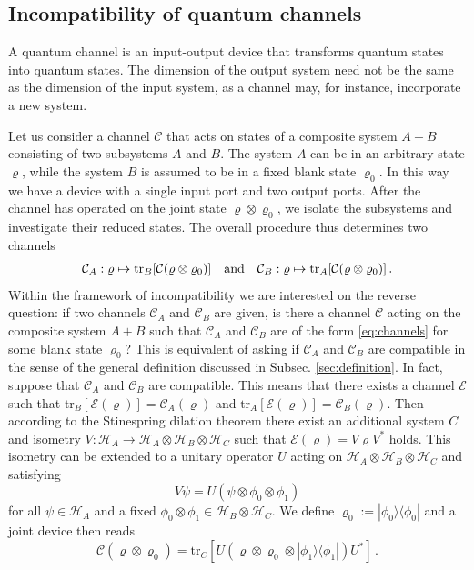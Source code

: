 \documentclass[12pt]{article}
\theoremstyle{definition}
\newcommand{\hi}{\mathcal{H}} %
\newcommand{\Cc}{\mathcal{C}} %
\newcommand{\Ec}{\mathcal{E}} %
\begin{document}
{%
\subsection{Incompatibility of quantum channels}

A quantum channel is an input-output device that transforms quantum states into quantum states. The dimension of the output system need not be the same as the dimension of the input system, as a channel may, for instance, incorporate a new system. 

Let us consider a channel $\Cc$ that acts on states of a composite system $A+B$ consisting of two subsystems $A$ and $B$. The system $A$ can be in an arbitrary state $\varrho$, while the system $B$ is assumed to be in a fixed blank state $\varrho_0$. 
In this way we have a device with a single input port and two output ports.
After the channel has operated on the joint state $\varrho \otimes \varrho_0$, we isolate the subsystems and investigate their reduced states.
The overall procedure thus determines two channels 
\begin{align}\label{eq:channels}
\Cc_A:\varrho \mapsto {\rm tr}_B[\Cc(\varrho \otimes \varrho_0)] \quad \textrm{and} \quad  \Cc_B:\varrho \mapsto {\rm tr}_A[\Cc(\varrho \otimes \varrho_0)] \, .
\end{align}
Within the framework of incompatibility we are interested on the reverse question: if two channels $\Cc_A$ and $\Cc_B$ are given, is there a channel $\Cc$ acting on the composite system $A+B$ such that $\Cc_A$ and $\Cc_B$ are of the form \eqref{eq:channels} for some blank state $\varrho_0$? 
This is equivalent of asking if $\Cc_A$ and $\Cc_B$ are compatible in the sense of the general definition discussed in Subsec. \ref{sec:definition}.
In fact, suppose that $\Cc_A$ and $\Cc_B$ are compatible. 
This means that there exists a channel $\Ec$ such that 
$\mbox{tr}_B [ \Ec (\varrho)] = \Cc_A(\varrho)$ and 
$\mbox{tr}_A [\Ec (\varrho)] =\Cc_B(\varrho)$. 
Then according to the Stinespring dilation theorem
there exist an additional system $C$ and 
isometry $V: \hi_A \to \hi_A \otimes \hi_B \otimes \hi_C$ 
such that $\Ec(\varrho) 
= V \varrho V^*$ holds.  
This isometry can be extended 
to a unitary operator $U$ acting on $\hi_A \otimes \hi_B \otimes \hi_C$
and satisfying 
\begin{equation}
V \psi = U (\psi  \otimes \phi_0 \otimes \phi_1)
\end{equation} 
for all $\psi \in \hi_A$ and a fixed $\phi_0 \otimes \phi_1 \in \hi_B \otimes \hi_C$.
We define $\varrho_0 := |\phi_0\rangle \langle \phi_0 |$ 
and a joint device then reads 
\begin{equation}
\Cc(\varrho \otimes \varrho_0) = \mbox{tr}_{C}[ U
 (\varrho \otimes \varrho_0 \otimes |\phi_1\rangle \langle \phi_1| ) U^*] \, .
 \end{equation}


}
\end{document}
